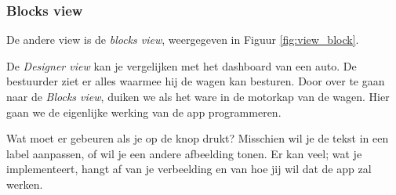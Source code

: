 %


\subsubsection{Blocks view}

De andere view is de \emph{blocks view}, weergegeven in Figuur \ref{fig:view_block}.


De \emph{Designer view} kan je vergelijken met het dashboard van een auto. De bestuurder ziet er alles waarmee hij de wagen kan besturen.
Door over te gaan naar de \emph{Blocks view}, duiken we als het ware in de motorkap van de wagen. Hier gaan we de eigenlijke werking van de app programmeren.

Wat moet er gebeuren als je op de knop drukt? Misschien wil je de tekst in een label aanpassen, of wil je een andere afbeelding tonen. Er kan veel; wat je implementeert, hangt af van je verbeelding en van hoe jij wil dat de app zal werken.

